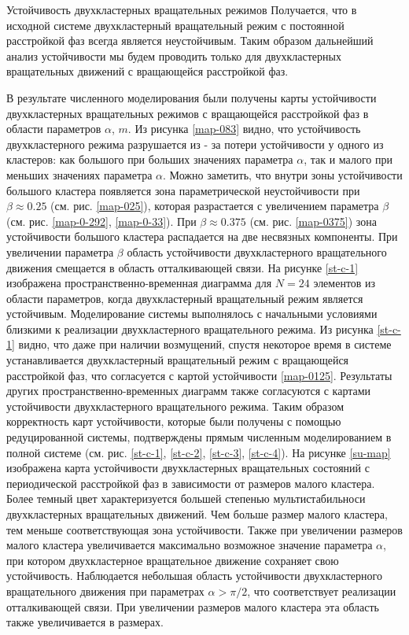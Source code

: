 \begin{chapter}{Устойчивость двухкластерных вращательных режимов}
	Получается, что в исходной системе двухкластерный вращательный режим с постоянной расстройкой фаз всегда является неустойчивым.
	Таким образом дальнейший анализ устойчивости мы будем проводить только для двухкластерных вращательных движений с вращающейся
	расстройкой фаз.


	В результате численного моделирования были получены карты устойчивости двухкластерных вращательных
	режимов с вращающейся расстройкой фаз в области параметров $\alpha$, $m$. Из рисунка \ref{map-083} видно, что устойчивость двухкластерного режима разрушается из - за потери устойчивости у одного из кластеров:
	как большого при больших значениях параметра $\alpha$, так и малого при меньших значениях параметра $\alpha$.
	Можно заметить, что внутри зоны устойчивости большого кластера появляется зона параметрической неустойчивости при $\beta \approx 0.25$ (см. рис. \ref{map-025}), которая
	разрастается с увеличением параметра $\beta$ (см. рис. \ref{map-0-292}, \ref{map-0-33}). При $\beta \approx 0.375$ (см. рис. \ref{map-0375}) зона устойчивости большого кластера
	распадается на две несвязных компоненты. При увеличении параметра $\beta$ область устойчивости двухкластерного вращательного движения смещается в область отталкивающей связи.
	На рисунке \ref{st-c-1} изображена пространственно-временная диаграмма для $N = 24$ элементов из области параметров, когда
	двухкластерный вращательный режим является устойчивым. Моделирование системы выполнялось с начальными условиями 
	близкими к реализации двухкластерного вращательного режима. Из рисунка \ref{st-c-1} видно, что даже при наличии возмущений,
	спустя некоторое время в системе устанавливается двухкластерный вращательный режим с вращающейся расстройкой фаз, что согласуется с
	картой устойчивости \ref{map-0125}. Результаты других пространственно-временных диаграмм также согласуются с картами устойчивости двухкластерного вращательного режима.
	Таким образом корректность карт устойчивости, которые были получены с помощью редуцированной системы, подтверждены прямым численным моделированием в полной системе (см. рис. \ref{st-c-1}, \ref{st-c-2}, \ref{st-c-3}, \ref{st-c-4}).
	На рисунке \ref{su-map} изображена карта устойчивости двухкластерных вращательных состояний с
	периодической расстройкой фаз в зависимости от размеров малого кластера. Более темный цвет
	характеризуется большей степенью мультистабильноси двухкластерных вращательных движений.
	Чем больше размер малого кластера, тем меньше соответствующая
	зона устойчивости. Также при увеличении размеров малого кластера увеличивается максимально возможное значение параметра
	$\alpha$, при котором двухкластерное вращательное движение сохраняет свою устойчивость.
	Наблюдается небольшая область устойчивости двухкластерного вращательного движения при параметрах $\alpha > \pi/2$, что соответствует
	реализации отталкивающей связи. При увеличении размеров малого кластера эта область также увеличивается в размерах.


\end{chapter}
